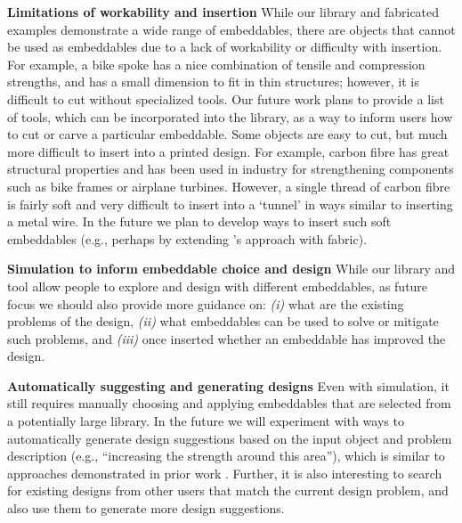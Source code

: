 \textbf{Limitations of workability and insertion}
While our library and fabricated examples demonstrate a wide range of embeddables, there are objects that cannot be used as embeddables due to a lack of workability or difficulty with insertion. For example, a bike spoke has a nice combination of tensile and compression strengths, and has a small dimension to fit in thin structures; however, it is difficult to cut without specialized tools. Our future work plans to provide a list of tools, which can be incorporated into the library, as a way to inform users how to cut or carve a particular embeddable. Some objects are easy to cut, but much more difficult to insert into a printed design. For example, carbon fibre has great structural properties and has been used in industry for strengthening components such as bike frames or airplane turbines. However, a single thread of carbon fibre is fairly soft and very difficult to insert into a `tunnel' in ways similar to inserting a metal wire. In the future we plan to develop ways to insert such soft embeddables (e.g., perhaps by extending \cite{rivera2017stretching}'s approach with fabric).

 \textbf{Simulation to inform embeddable choice and design}
 While our library and tool allow people to explore and design with different embeddables, as future focus we should also provide more guidance on: {\em(i)} what are the existing problems of the design, {\em(ii)} what embeddables can be used to solve or mitigate such problems, and {\em(iii)} once inserted whether an embeddable has improved the design. 

\textbf{Automatically suggesting and generating designs}
Even with simulation, it still requires manually choosing and applying embeddables that are selected from a potentially large library. In the future we will experiment with ways to automatically generate design suggestions based on the input object and problem description (e.g., ``increasing the strength around this area''), which is similar to approaches demonstrated in prior work \cite{terry2002side}. Further, it is also interesting to search for existing designs from other users that match the current design problem, and also use them to generate more design suggestions.


